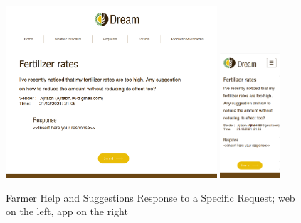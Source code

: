 \documentclass{article}
\begin{document}
        \begin{figure} [h]
            \centering
            \includegraphics[width=0.7\textwidth]{images/UserInterfaces/Farmer/HelpAndSuggestions/ResponseSpecificRequestWeb.png}
            \quad
            \includegraphics[width=0.2\textwidth]{images/UserInterfaces/Farmer/HelpAndSuggestions/ResponseSpecificRequestApp.png}
            \quad
            \caption{\label{fig:farmerHelpResponseSpecificRequest}Farmer Help and Suggestions Response to a Specific Request; web on the left, app on the right}
        \end{figure}
    
    \newpage
    
\end{document}
